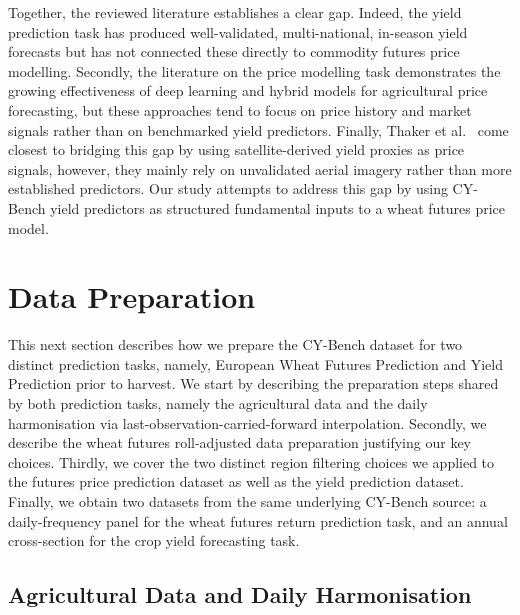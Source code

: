 \documentclass[pdflatex,sn-mathphys-num, oneside, 11pt]{sn-jnl}%
\theoremstyle{thmstyleone}%
\theoremstyle{thmstyletwo}%
\theoremstyle{thmstylethree}%
\begin{document}
Together, the reviewed literature establishes a clear gap. Indeed, the yield prediction task has produced well-validated, multi-national, in-season yield forecasts but has not connected these directly to commodity futures price modelling. Secondly, the literature on the price modelling task demonstrates the growing effectiveness of deep learning and hybrid models for agricultural price forecasting, but these approaches tend to focus on price history and market signals rather than on benchmarked yield predictors. Finally, Thaker et al.~\cite{bib19} come closest to bridging this gap by using satellite-derived yield proxies as price signals, however, they mainly rely on unvalidated aerial imagery rather than more established predictors. Our study attempts to address this gap by using CY-Bench yield predictors as structured fundamental inputs to a wheat futures price model.\\

\section{Data Preparation}\label{sec:dataprep}

This next section describes how we prepare the CY-Bench dataset for two distinct prediction tasks, namely, European Wheat Futures Prediction and Yield Prediction prior to harvest. We start by describing the preparation steps shared by both prediction tasks, namely the agricultural data and the daily harmonisation via last-observation-carried-forward interpolation. Secondly, we describe the wheat futures roll-adjusted data preparation justifying our key choices. Thirdly, we cover the two distinct region filtering choices we applied to the futures price prediction dataset as well as the yield prediction dataset. Finally, we obtain two datasets from the same underlying CY-Bench source: a daily-frequency panel for the wheat futures return prediction task, and an annual cross-section for the crop yield forecasting task.

\subsection{Agricultural Data and Daily Harmonisation}
\end{document}
